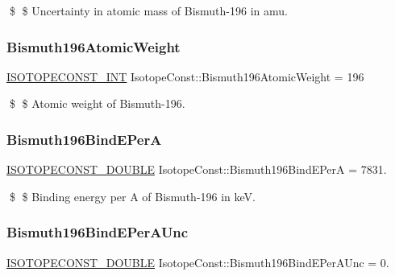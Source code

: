 \$ \$ Uncertainty in atomic mass of Bismuth-\/196 in amu. \mbox{\label{group___isotope_const-_bismuth-_bi196_gac846d6cce27ac636a122d6ed6cbeddf4}} 
\subsubsection{\texorpdfstring{Bismuth196\+Atomic\+Weight}{Bismuth196AtomicWeight}}
{\footnotesize\ttfamily \mbox{\hyperlink{group___isotope_const-_macros_ga5f18360b3e99483a35c32d789e62621c}{I\+S\+O\+T\+O\+P\+E\+C\+O\+N\+S\+T\+\_\+\+I\+NT}} Isotope\+Const\+::\+Bismuth196\+Atomic\+Weight = 196}

\$ \$ Atomic weight of Bismuth-\/196. \mbox{\label{group___isotope_const-_bismuth-_bi196_ga6c7bbef767b1ac3bcddb12d4a1326c4e}} 
\subsubsection{\texorpdfstring{Bismuth196\+Bind\+E\+PerA}{Bismuth196BindEPerA}}
{\footnotesize\ttfamily \mbox{\hyperlink{group___isotope_const-_macros_ga8f45a7272ce02c0b4c65c44636ed719a}{I\+S\+O\+T\+O\+P\+E\+C\+O\+N\+S\+T\+\_\+\+D\+O\+U\+B\+LE}} Isotope\+Const\+::\+Bismuth196\+Bind\+E\+PerA = 7831.}

\$ \$ Binding energy per A of Bismuth-\/196 in keV. \mbox{\label{group___isotope_const-_bismuth-_bi196_gad596386126283137896fe2ab841aaa86}} 
\subsubsection{\texorpdfstring{Bismuth196\+Bind\+E\+Per\+A\+Unc}{Bismuth196BindEPerAUnc}}
{\footnotesize\ttfamily \mbox{\hyperlink{group___isotope_const-_macros_ga8f45a7272ce02c0b4c65c44636ed719a}{I\+S\+O\+T\+O\+P\+E\+C\+O\+N\+S\+T\+\_\+\+D\+O\+U\+B\+LE}} Isotope\+Const\+::\+Bismuth196\+Bind\+E\+Per\+A\+Unc = 0.}

